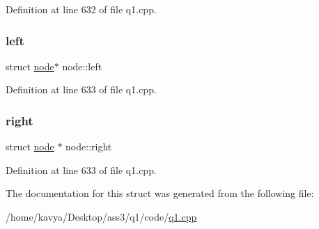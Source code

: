 Definition at line 632 of file q1.\+cpp.

\mbox{\label{structnode_a3ce38490a651bfda86d88ff955e96abc}} 
\subsubsection{\texorpdfstring{left}{left}}
{\footnotesize\ttfamily struct \hyperlink{structnode}{node}$\ast$ node\+::left}



Definition at line 633 of file q1.\+cpp.

\mbox{\label{structnode_a51e160f22dc6064bac4a4f9f1d931c2c}} 
\subsubsection{\texorpdfstring{right}{right}}
{\footnotesize\ttfamily struct \hyperlink{structnode}{node} $\ast$ node\+::right}



Definition at line 633 of file q1.\+cpp.



The documentation for this struct was generated from the following file\+:\begin{DoxyCompactItemize}
\item 
/home/kavya/\+Desktop/ass3/q1/code/\hyperlink{q1_8cpp}{q1.\+cpp}\end{DoxyCompactItemize}
